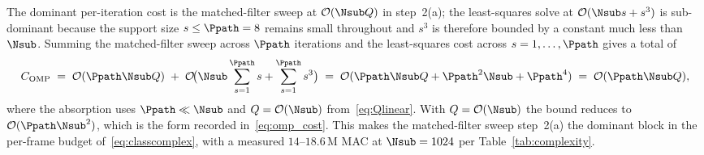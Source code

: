 The dominant per-iteration cost is the matched-filter sweep at $\mathcal{O}(\Nsub Q)$ in step~2(a); the least-squares solve at $\mathcal{O}(\Nsub s + s^3)$ is sub-dominant because the support size $s \leq \Ppath = 8$ remains small throughout and $s^3$ is therefore bounded by a constant much less than $\Nsub$. Summing the matched-filter sweep across $\Ppath$ iterations and the least-squares cost across $s = 1, \dots, \Ppath$ gives a total of
\begin{equation*}
C_\text{OMP} \;=\; \mathcal{O}(\Ppath \Nsub Q) \;+\; \mathcal{O}\!\bigl(\Nsub \sum_{s=1}^{\Ppath} s + \sum_{s=1}^{\Ppath} s^3\bigr) \;=\; \mathcal{O}(\Ppath \Nsub Q + \Ppath^2 \Nsub + \Ppath^4) \;=\; \mathcal{O}(\Ppath \Nsub Q),
\end{equation*}
where the absorption uses $\Ppath \ll \Nsub$ and $Q = \mathcal{O}(\Nsub)$ from~\eqref{eq:Qlinear}. With $Q = \mathcal{O}(\Nsub)$ the bound reduces to $\mathcal{O}(\Ppath \Nsub^2)$, which is the form recorded in~\eqref{eq:omp_cost}. This makes the matched-filter sweep step~2(a) the dominant block in the per-frame budget of~\eqref{eq:classcomplex}, with a measured $14$--$18.6$\,M MAC at $\Nsub = 1024$ per Table~\ref{tab:complexity}.
